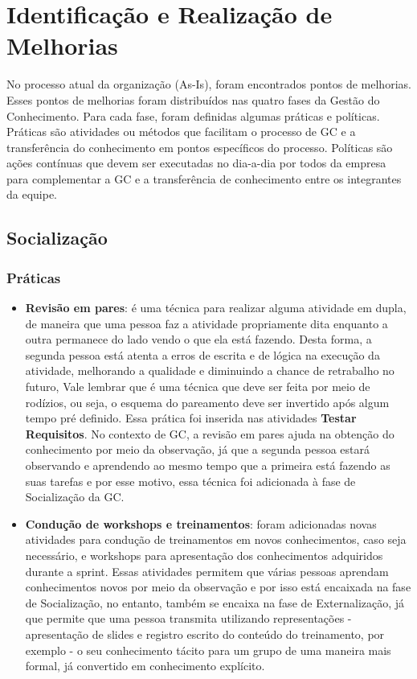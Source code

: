 \section{Identificação e Realização de Melhorias}
No processo atual da organização (As-Is), foram encontrados pontos de melhorias. Esses pontos de melhorias foram distribuídos nas quatro fases da Gestão do Conhecimento. Para cada fase, foram definidas algumas práticas e políticas. Práticas são atividades ou métodos que facilitam o processo de GC e a transferência do conhecimento em pontos específicos do processo. Políticas são ações contínuas que devem ser executadas no dia-a-dia por todos da empresa  para complementar a GC e a transferência de conhecimento entre os integrantes da equipe.

\subsection{Socialização}
\subsubsection{Práticas}
\begin{itemize}
\item \textbf{Revisão em pares}: é uma técnica para realizar alguma atividade em dupla, de maneira que uma pessoa faz a atividade propriamente dita enquanto a outra permanece do lado vendo o que ela está fazendo. Desta forma, a segunda pessoa está atenta a erros de escrita e de lógica na execução da atividade, melhorando a qualidade e diminuindo a chance de retrabalho no futuro, Vale lembrar que é uma técnica que deve ser feita por meio de rodízios, ou seja, o esquema do pareamento deve ser invertido após algum tempo pré definido. Essa prática foi inserida nas atividades \textbf{Testar Requisitos}. No contexto de GC, a revisão em pares ajuda na obtenção do conhecimento por meio da observação, já que a segunda pessoa estará observando e aprendendo ao mesmo tempo que a primeira está fazendo as suas tarefas e por esse motivo, essa técnica foi adicionada à fase de Socialização da GC.
\item \textbf{Condução de workshops e treinamentos}: foram adicionadas novas atividades para condução de treinamentos em novos conhecimentos, caso seja necessário, e workshops para apresentação dos conhecimentos adquiridos durante a sprint. Essas atividades permitem que várias pessoas aprendam conhecimentos novos por meio da observação e por isso está encaixada na fase de Socialização, no entanto, também se encaixa na fase de Externalização, já que permite que uma pessoa transmita utilizando representações - apresentação de slides e registro escrito do conteúdo do treinamento, por exemplo - o seu conhecimento tácito para um grupo de uma maneira mais formal, já convertido em conhecimento explícito.
\end{itemize}

